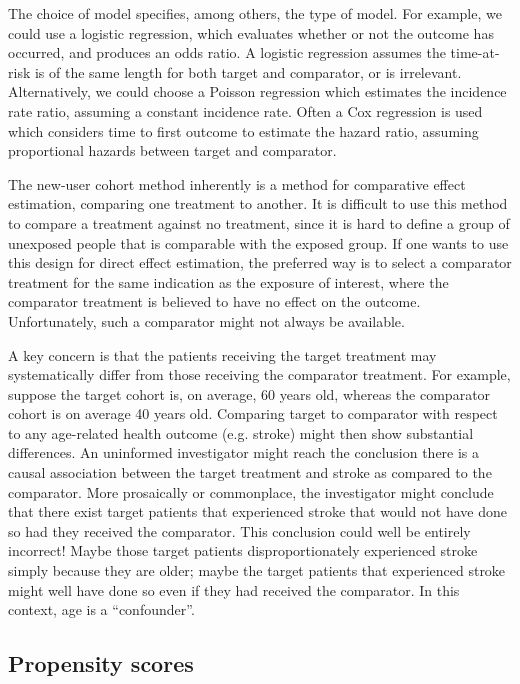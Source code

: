 \documentclass[11pt]{book}
\let\BeginKnitrBlock\begin \let\EndKnitrBlock\end
\begin{document}
The choice of model specifies, among others, the type of model. For
example, we could use a logistic regression, which evaluates whether or
not the outcome has occurred, and produces an odds ratio. A logistic
regression assumes the time-at-risk is of the same length for both
target and comparator, or is irrelevant. Alternatively, we could choose
a Poisson regression which estimates the incidence rate ratio, assuming
a constant incidence rate. Often a Cox regression is used which
considers time to first outcome to estimate the hazard ratio, assuming
proportional hazards between target and comparator.

\BeginKnitrBlock{rmdimportant}
The new-user cohort method inherently is a method for comparative effect
estimation, comparing one treatment to another. It is difficult to use
this method to compare a treatment against no treatment, since it is
hard to define a group of unexposed people that is comparable with the
exposed group. If one wants to use this design for direct effect
estimation, the preferred way is to select a comparator treatment for
the same indication as the exposure of interest, where the comparator
treatment is believed to have no effect on the outcome. Unfortunately,
such a comparator might not always be available.
\EndKnitrBlock{rmdimportant}

A key concern is that the patients receiving the target treatment may
systematically differ from those receiving the comparator treatment. For
example, suppose the target cohort is, on average, 60 years old, whereas
the comparator cohort is on average 40 years old. Comparing target to
comparator with respect to any age-related health outcome (e.g. stroke)
might then show substantial differences. An uninformed investigator
might reach the conclusion there is a causal association between the
target treatment and stroke as compared to the comparator. More
prosaically or commonplace, the investigator might conclude that there
exist target patients that experienced stroke that would not have done
so had they received the comparator. This conclusion could well be
entirely incorrect! Maybe those target patients disproportionately
experienced stroke simply because they are older; maybe the target
patients that experienced stroke might well have done so even if they
had received the comparator. In this context, age is a ``confounder''.

\subsection{Propensity scores}\label{propensity-scores}
\end{document}
